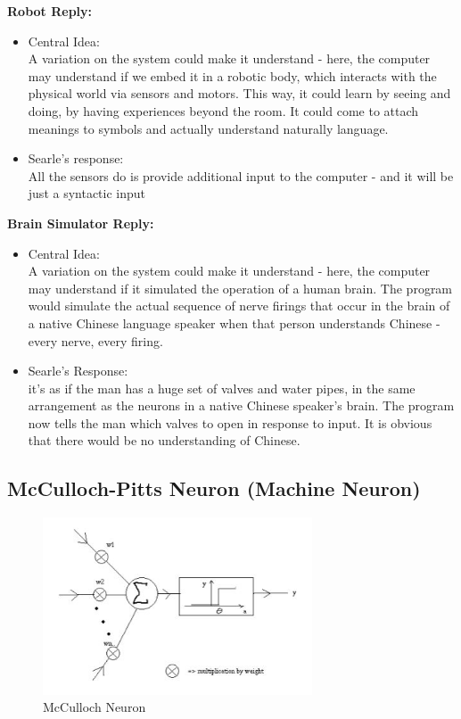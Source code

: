 \documentclass{article}
\begin{document}
\noindent\textbf{Robot Reply:} 
\begin{itemize}
    \item Central Idea: \\
A variation on the system could make it understand - here, the computer may understand if we embed it in a robotic body, which interacts with the physical world via sensors and motors. This way, it could learn by seeing and doing, by having experiences beyond the room. It could come to attach meanings to symbols and actually understand naturally language.  
    \item 
Searle's response: \\
All the sensors do is provide additional input to the computer - and it will be just a syntactic input 
\end{itemize}


\noindent\textbf{Brain Simulator Reply:} 
\begin{itemize}
    \item Central Idea: \\
A variation on the system could make it understand - here, the computer may understand if it simulated the operation of a human brain. The program would simulate the actual sequence of nerve firings that occur in the brain of a native Chinese language speaker when that person understands Chinese - every nerve, every firing. 
    \item Searle's Response: \\ 
it's as if the man has a huge set of valves and water pipes, in the same arrangement as the neurons in a native Chinese speaker's brain. The program now tells the man which valves to open in response to input. It is obvious that there would be no understanding of Chinese. 
\end{itemize}

\subsection{McCulloch-Pitts Neuron (Machine Neuron)}
\begin{figure}[htp]
\centering
\includegraphics[width=8cm]{images/mccullochneuron.JPG}
\caption{McCulloch Neuron}
\label{fig: Machine neuron}
\end{figure}
\end{document}
